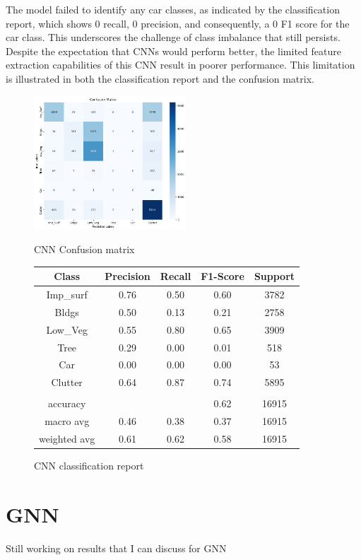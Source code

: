 The model failed to identify any car classes, as indicated by the classification report, which shows 0 recall, 0 precision, and consequently, a 0 F1 score for the car class. This underscores the challenge of class imbalance that still persists. Despite the expectation that CNNs would perform better, the limited feature extraction capabilities of this CNN result in poorer performance. This limitation is illustrated in both the classification report and the confusion matrix.
\begin{figure}[h]
    \centering
    \begin{minipage}[b]{0.45\linewidth}
        \centering
        \includegraphics[height=5cm]{images/CNN CM.png} %
        \caption{CNN Confusion matrix}
        \label{fig:CNN_CM}
    \end{minipage}
    \begin{minipage}[b]{0.45\linewidth}
        \centering
        \begin{tabular}{c|c|c|c|c}
        \hline
             Class & Precision & Recall & F1-Score & Support \\
             \hline
             Imp\_surf & 0.76 & 0.50 & 0.60 & 3782 \\
             Bldgs & 0.50 & 0.13 & 0.21 & 2758 \\
             Low\_Veg & 0.55 & 0.80 & 0.65 & 3909 \\
             Tree & 0.29 & 0.00 & 0.01 & 518 \\
             Car & 0.00 & 0.00 & 0.00 & 53 \\
             Clutter & 0.64 & 0.87 & 0.74 & 5895 \\
             \hline
             & & & & \\
             accuracy & & & 0.62 & 16915 \\
             macro avg & 0.46 & 0.38 & 0.37 & 16915 \\
             weighted avg & 0.61 & 0.62 & 0.58 & 16915 \\
        \end{tabular}
        \caption{CNN classification report}
        \label{tab:CNN_F1}
    \end{minipage}
\end{figure}


\section{GNN}
Still working on results that I can discuss for GNN